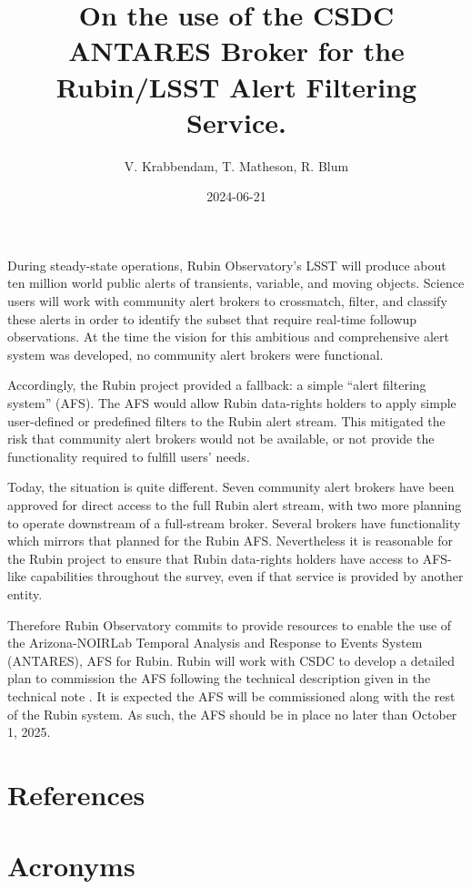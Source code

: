 \documentclass[DM,authoryear]{lsstdoc}
\title{On the use of the CSDC ANTARES Broker for the Rubin/LSST Alert Filtering Service.}
\author{V. Krabbendam, T. Matheson, R. Blum}
\date{2024-06-21}
\begin{document}
        
\mkmemotitle

During steady-state operations, Rubin Observatory's LSST will produce about ten million world public alerts of transients, variable, and moving objects. Science users will work with community alert
brokers to crossmatch, filter, and classify these alerts in order to identify the subset that require real-time followup observations. 
At the time the vision for this ambitious and comprehensive alert system was developed, no community alert brokers were functional.

Accordingly, the Rubin project provided a fallback: a simple “alert filtering system” (AFS). 
The AFS would allow Rubin data-rights holders to apply simple user-defined or predefined filters to the Rubin alert stream. 
This mitigated the risk that community alert brokers would not be available, or not provide the functionality required to fulfill users' needs.

Today, the situation is quite different. 
Seven community alert brokers have been approved for direct access to the full Rubin alert stream, with two more planning to operate downstream of a full-stream broker. 
Several brokers have functionality which mirrors that planned for the Rubin AFS. 
Nevertheless it is reasonable for the Rubin project to ensure that Rubin data-rights holders have access to AFS-like capabilities throughout the survey, even if that service is provided by another entity.

Therefore Rubin Observatory commits to provide resources to enable the use of the Arizona-NOIRLab Temporal Analysis and Response to Events System (ANTARES),   \citep{2021AJ....161..107M} AFS for Rubin. 
Rubin will work with CSDC to develop a detailed plan to commission the AFS following the technical description given in the  technical note . 
It is expected the AFS will be commissioned along with the rest of the Rubin system. 
As such, the AFS should be in place no later than October 1, 2025.

\clearpage
\appendix
\section{References} \label{sec:bib}
\renewcommand{\refname}{} %


\section{Acronyms} \label{sec:acronyms}

\end{document}
